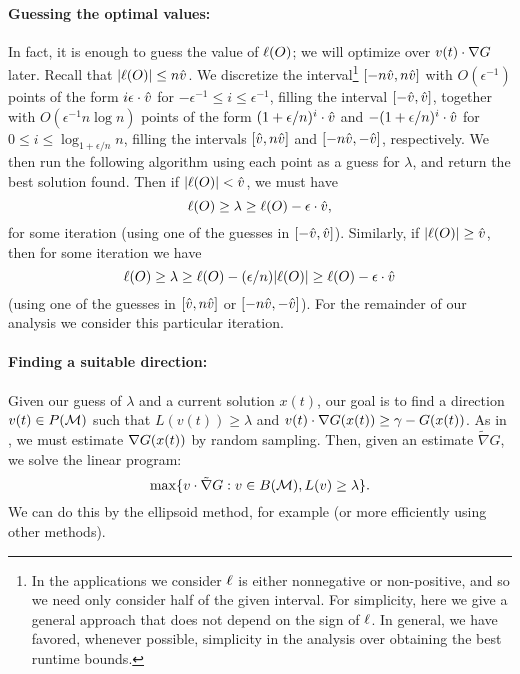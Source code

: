 \documentclass{article}
\theoremstyle{definition}
\begin{document}
\paragraph{Guessing the optimal values:}
In fact, it is enough to guess the value of $\ell(O)$; we will optimize over $v(t) \cdot \nabla G$ later.  
Recall that $|\ell(O)| \le n\hat{v}$.  We discretize the interval\footnote{In the applications we consider $\ell$ is either nonnegative or non-positive, and so we need only consider half of the given interval.  For simplicity, here we give a general approach that does not depend on the sign of $\ell$.  In general, we have favored, whenever possible, simplicity in the analysis over obtaining the best runtime bounds.} $[-n\hat{v}, n\hat{v}]$ with $O(\epsilon^{-1})$ points of the form $i \epsilon \cdot \hat{v}$ for $-\epsilon^{-1} \le i \le \epsilon^{-1}$, filling the interval $[-\hat{v}, \hat{v}]$, together with $O(\epsilon^{-1}n\log n)$ points of the form $(1 + \epsilon/n)^{i}\cdot\hat{v}$ and $-(1 + \epsilon/n)^{i}\cdot\hat{v}$ for $0 \le i \le \log_{1 + \epsilon/n} n$, filling the intervals $[\hat{v}, n\hat{v}]$ and $[-n\hat{v}, -\hat{v}]$, respectively.  We then run the following algorithm using each point as a guess for $\lambda$, and return the best solution found.  Then if $|\ell(O)| < \hat{v}$, we must have  
$$\ell(O) \ge \lambda \ge \ell(O) - \epsilon\cdot\hat{v},$$ for some iteration (using one of the guesses in $[-\hat{v}, \hat{v}]$).  Similarly, if $|\ell(O)| \ge \hat{v}$, then for some iteration we have
$$\ell(O) \ge \lambda \ge \ell(O) - (\epsilon/n)|\ell(O)| \ge \ell(O) - \epsilon\cdot\hat{v}$$
(using one of the guesses in $[\hat{v}, n\hat{v}]$ or $[-n\hat{v}, -\hat{v}]$).  For the remainder of our analysis we consider this particular iteration.

\paragraph{Finding a suitable direction:}
Given our guess of $\lambda$ and a current solution $x(t)$, our goal is to find a direction $v(t) \in P(\mathcal{M})$ such that
$L(v(t)) \geq \lambda$ and $v(t) \cdot \nabla G(x(t)) \geq \gamma - G(x(t))$.  As in \cite{Calinescu2011}, we must estimate $\nabla G(x(t))$ by random sampling.   Then, given an estimate $\tilde{\nabla}G$, we solve the linear program:
\begin{equation}
\max \{ v \cdot \tilde{\nabla} G:  v \in B(\mathcal{M}),  L(v) \geq \lambda \}.\label{eq:lp}
\end{equation}
We can do this by the ellipsoid method, for example (or more efficiently using other methods).
\end{document}
